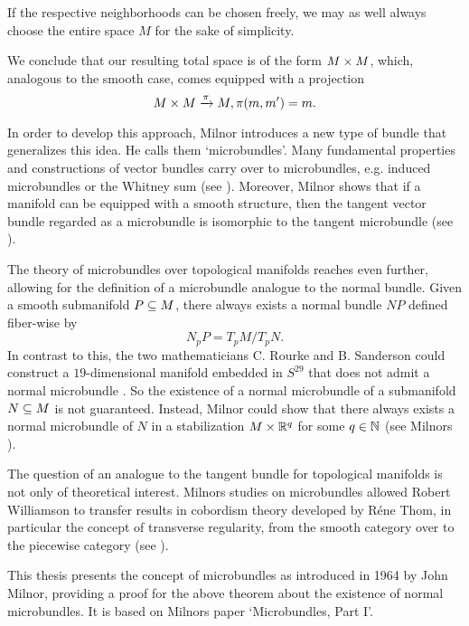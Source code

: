 \begin{myparagraph}
If the respective neighborhoods can be chosen freely, we may as well always choose the entire space $M$ for the sake of simplicity.

We conclude that our resulting total space is of the form $M \times M$, which, analogous to the smooth case, comes equipped with a projection \[ M \times M \xrightarrow{\pi} M, \pi(m, m') = m. \]

In order to develop this approach, Milnor introduces a new type of bundle that generalizes this idea. He calls them `microbundles'. Many fundamental properties and constructions of vector bundles carry over to microbundles, e.g. induced microbundles or the Whitney sum (see ). Moreover, Milnor shows that if a manifold can be equipped with a smooth structure, then the tangent vector bundle regarded as a microbundle is isomorphic to the tangent microbundle (see ).

The theory of microbundles over topological manifolds reaches even further, allowing for the definition of a microbundle analogue to the normal bundle. Given a smooth submanifold $P \subseteq{} M$, there always exists a normal bundle $NP$ defined fiber-wise by \[ N_p P = T_p M / T_p N. \] In contrast to this, the two mathematicians C. Rourke and B. Sanderson could construct a $19$-dimensional manifold embedded in $S^{29}$ that does not admit a normal microbundle \cite{rourke}. So the existence of a normal microbundle of a submanifold $N \subseteq{} M$ is not guaranteed. Instead, Milnor could show that there always exists a normal microbundle of $N$ in a stabilization $M \times \mathbb{R}^q$ for some $q \in \mathbb{N}$ (see Milnors ).

The question of an analogue to the tangent bundle for topological manifolds is not only of theoretical interest. Milnors studies on microbundles allowed Robert Williamson to transfer results in cobordism theory developed by Réne Thom, in particular the concept of transverse regularity, from the smooth category over to the piecewise category (see \cite[§3]{williamson}).

This thesis presents the concept of microbundles as introduced in 1964 by John Milnor, providing a proof for the above theorem about the existence of normal microbundles. It is based on Milnors paper `Microbundles, Part I'. \end{myparagraph}